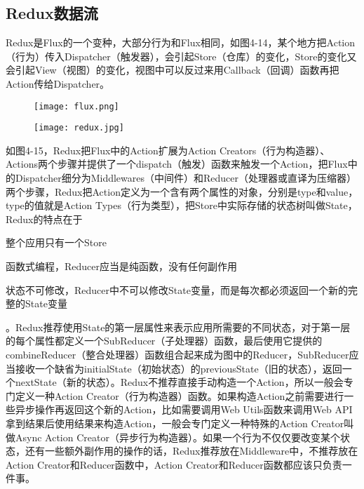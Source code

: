 \subsection{Redux数据流}
Redux是Flux的一个变种，大部分行为和Flux相同，如图4-14，某个地方把Action（行为）传入Dispatcher（触发器），会引起Store（仓库）的变化，Store的变化又会引起View（视图）的变化，视图中可以反过来用Callback（回调）函数再把Action传给Dispatcher。
\begin{figure}[!htp]
 \centering
 \texttt{[image: flux.png]}
\end{figure}

\begin{figure}[!htp]
 \centering
 \texttt{[image: redux.jpg]}
\end{figure}

如图4-15，Redux把Flux中的Action扩展为Action Creators（行为构造器）、Actions两个步骤并提供了一个dispatch（触发）函数来触发一个Action，把Flux中的Dispatcher细分为Middlewares（中间件）和Reducer（处理器或直译为压缩器）两个步骤，Redux把Action定义为一个含有两个属性的对象，分别是type和value，type的值就是Action Types（行为类型），把Store中实际存储的状态树叫做State，Redux的特点在于
\begin{enumerate*}
  \item 整个应用只有一个Store
  \item 函数式编程，Reducer应当是纯函数，没有任何副作用
  \item 状态不可修改，Reducer中不可以修改State变量，而是每次都必须返回一个新的完整的State变量
\end{enumerate*}。Redux推荐使用State的第一层属性来表示应用所需要的不同状态，对于第一层的每个属性都定义一个SubReducer（子处理器）函数，最后使用它提供的combineReducer（整合处理器）函数组合起来成为图中的Reducer，SubReducer应当接收一个缺省为initialState（初始状态）的previousState（旧的状态），返回一个nextState（新的状态）。Redux不推荐直接手动构造一个Action，所以一般会专门定义一种Action Creator（行为构造器）函数。如果构造Action之前需要进行一些异步操作再返回这个新的Action，比如需要调用Web Utils函数来调用Web API拿到结果后使用结果来构造Action，一般会专门定义一种特殊的Action Creator叫做Async Action Creator（异步行为构造器）。如果一个行为不仅仅要改变某个状态，还有一些额外副作用的操作的话，Redux推荐放在Middleware中，不推荐放在Action Creator和Reducer函数中，Action Creator和Reducer函数都应该只负责一件事。

